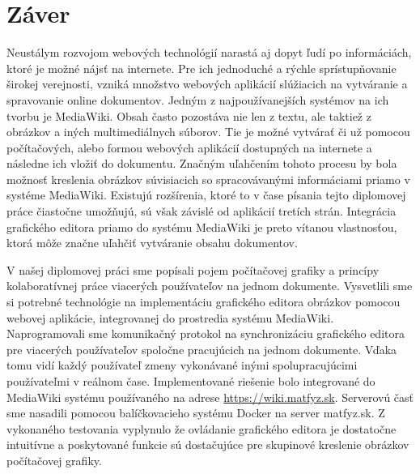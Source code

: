 \chapter{Záver}\label{chap:conclusion}
Neustálym rozvojom webových technológií narastá aj dopyt ľudí po informáciách, ktoré je možné nájsť na internete. Pre ich jednoduché a rýchle sprístupňovanie širokej verejnosti, vzniká množstvo webových aplikácií slúžiacich na vytváranie a spravovanie online dokumentov. Jedným z najpoužívanejších systémov na ich tvorbu je MediaWiki. Obsah často pozostáva nie len z textu, ale taktiež z obrázkov a iných multimediálnych súborov. Tie je možné vytvárať či už pomocou počítačových, alebo formou webových aplikácií dostupných na internete a následne ich vložiť do dokumentu. Značným uľahčením tohoto procesu by bola možnosť kreslenia obrázkov súvisiacich so spracovávanými informáciami priamo v systéme MediaWiki. Existujú rozšírenia, ktoré to v čase písania tejto diplomovej práce čiastočne umožňujú, sú však závislé od aplikácií tretích strán. Integrácia grafického editora priamo do systému MediaWiki je preto vítanou vlastnosťou, ktorá môže značne uľahčiť vytváranie obsahu dokumentov.

V našej diplomovej práci sme popísali pojem počítačovej grafiky a princípy kolaboratívnej práce viacerých používateľov na jednom dokumente. Vysvetlili sme si potrebné technológie na implementáciu grafického editora obrázkov pomocou webovej aplikácie, integrovanej do prostredia systému MediaWiki. Naprogramovali sme komunikačný protokol na synchronizáciu grafického editora pre viacerých používateľov spoločne pracujúcich na jednom dokumente. Vďaka tomu vidí každý používateľ zmeny vykonávané inými spolupracujúcimi používateľmi v reálnom čase. Implementované riešenie bolo integrované do MediaWiki systému používaného na adrese \url{https://wiki.matfyz.sk}. Serverovú časť sme nasadili pomocou balíčkovacieho systému Docker na server matfyz.sk. Z vykonaného testovania vyplynulo že ovládanie grafického editora je dostatočne intuitívne a poskytované funkcie sú dostačujúce pre skupinové kreslenie obrázkov počítačovej grafiky.